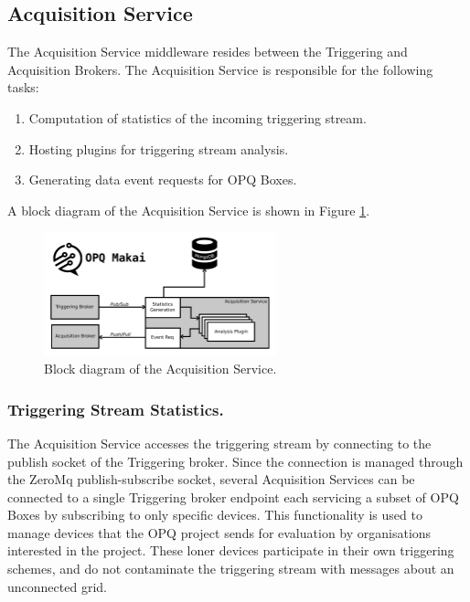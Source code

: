 \subsection{Acquisition Service}\label{subsec:acquisition-service}

The Acquisition Service middleware resides between the Triggering and Acquisition Brokers.
The Acquisition Service is responsible for the following tasks:
\begin{enumerate}
	\item Computation of statistics of the incoming triggering stream.
	\item Hosting plugins for triggering stream analysis.
	\item Generating data event requests for OPQ Boxes.
\end{enumerate}
A block diagram of the Acquisition Service is shown in Figure \ref{fig:opq:makai_aqs}.
\begin{figure}[h]
	\begin{center}
		\includegraphics[width=0.6\textwidth]{img/makai_aqs.pdf}
	\end{center}
	\caption{Block diagram of the Acquisition Service.}
	\label{fig:opq:makai_aqs}
\end{figure}

\subsubsection{Triggering Stream Statistics.}

The Acquisition Service accesses the triggering stream by connecting to the publish socket of the Triggering broker.
Since the connection is managed through the ZeroMq publish-subscribe socket, several Acquisition Services can be connected to a single Triggering broker endpoint each servicing a subset of OPQ Boxes by subscribing to only specific devices.
This functionality is used to manage devices that the OPQ project sends for evaluation by organisations interested in the project.
These loner devices participate in their own triggering schemes, and do not contaminate the triggering stream with messages about an unconnected grid.

